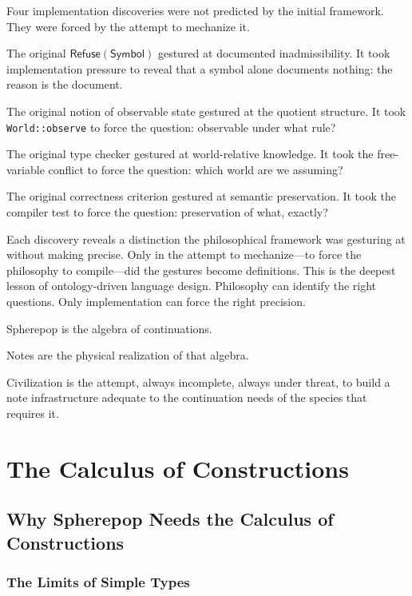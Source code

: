 \documentclass[12pt, a4paper, openany]{book}
\theoremstyle{plain}
\theoremstyle{definition}
\theoremstyle{remark}
\newcommand{\Refuse}{\mathsf{Refuse}}
\begin{document}
Four implementation discoveries were not predicted by the initial framework. They
were forced by the attempt to mechanize it.

The original $\Refuse(\mathsf{Symbol})$ gestured at documented inadmissibility.
It took implementation pressure to reveal that a symbol alone documents nothing:
the reason is the document.

The original notion of observable state gestured at the quotient structure. It
took \texttt{World::observe} to force the question: observable under what rule?

The original type checker gestured at world-relative knowledge. It took the
free-variable conflict to force the question: which world are we assuming?

The original correctness criterion gestured at semantic preservation. It took the
compiler test to force the question: preservation of what, exactly?

Each discovery reveals a distinction the philosophical framework was gesturing at
without making precise. Only in the attempt to mechanize---to force the philosophy
to compile---did the gestures become definitions. This is the deepest lesson of
ontology-driven language design. Philosophy can identify the right questions. Only
implementation can force the right precision.

\medskip

Spherepop is the algebra of continuations.

Notes are the physical realization of that algebra.

Civilization is the attempt, always incomplete, always under threat, to build a
note infrastructure adequate to the continuation needs of the species that requires
it.

\newpage


\part{The Calculus of Constructions}

\chapter{Why Spherepop Needs the Calculus of Constructions}

\section{The Limits of Simple Types}
\end{document}
